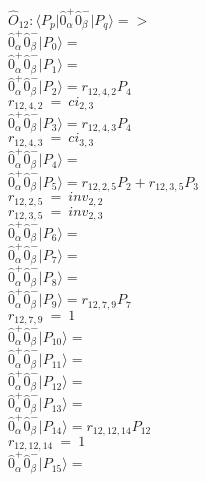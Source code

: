 \documentclass[14pt]{article}
\begin{document}
    $\hat{O}_{12}:  \langle{P_p}\vert \hat{0}_{\alpha}^{+}\hat{0}_{\beta}^{-} \vert{P_q}\rangle => $ \\ 
    $ \hat{0}_{\alpha}^{+}\hat{0}_{\beta}^{-} \vert{P_{0}}\rangle =  $ \\ 
    $ \hat{0}_{\alpha}^{+}\hat{0}_{\beta}^{-} \vert{P_{1}}\rangle =  $ \\ 
    $ \hat{0}_{\alpha}^{+}\hat{0}_{\beta}^{-} \vert{P_{2}}\rangle = {r}_{12,4,2}P_{4} $ \\ 
    ${r}_{12,4,2}\ =\ {ci}_{2,3} $ \\ 
    $ \hat{0}_{\alpha}^{+}\hat{0}_{\beta}^{-} \vert{P_{3}}\rangle = {r}_{12,4,3}P_{4} $ \\ 
    ${r}_{12,4,3}\ =\ {ci}_{3,3} $ \\ 
    $ \hat{0}_{\alpha}^{+}\hat{0}_{\beta}^{-} \vert{P_{4}}\rangle =  $ \\ 
    $ \hat{0}_{\alpha}^{+}\hat{0}_{\beta}^{-} \vert{P_{5}}\rangle = {r}_{12,2,5}P_{2}+{r}_{12,3,5}P_{3} $ \\ 
    ${r}_{12,2,5}\ =\ {inv}_{2,2} $ \\ 
    ${r}_{12,3,5}\ =\ {inv}_{2,3} $ \\ 
    $ \hat{0}_{\alpha}^{+}\hat{0}_{\beta}^{-} \vert{P_{6}}\rangle =  $ \\ 
    $ \hat{0}_{\alpha}^{+}\hat{0}_{\beta}^{-} \vert{P_{7}}\rangle =  $ \\ 
    $ \hat{0}_{\alpha}^{+}\hat{0}_{\beta}^{-} \vert{P_{8}}\rangle =  $ \\ 
    $ \hat{0}_{\alpha}^{+}\hat{0}_{\beta}^{-} \vert{P_{9}}\rangle = {r}_{12,7,9}P_{7} $ \\ 
    ${r}_{12,7,9}\ =\ 1 $ \\ 
    $ \hat{0}_{\alpha}^{+}\hat{0}_{\beta}^{-} \vert{P_{10}}\rangle =  $ \\ 
    $ \hat{0}_{\alpha}^{+}\hat{0}_{\beta}^{-} \vert{P_{11}}\rangle =  $ \\ 
    $ \hat{0}_{\alpha}^{+}\hat{0}_{\beta}^{-} \vert{P_{12}}\rangle =  $ \\ 
    $ \hat{0}_{\alpha}^{+}\hat{0}_{\beta}^{-} \vert{P_{13}}\rangle =  $ \\ 
    $ \hat{0}_{\alpha}^{+}\hat{0}_{\beta}^{-} \vert{P_{14}}\rangle = {r}_{12,12,14}P_{12} $ \\ 
    ${r}_{12,12,14}\ =\ 1 $ \\ 
    $ \hat{0}_{\alpha}^{+}\hat{0}_{\beta}^{-} \vert{P_{15}}\rangle =  $ \\ 
    
\end{document}
